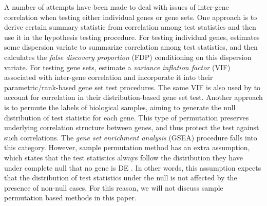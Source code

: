 	A number of attempts have been made to deal with issues of inter-gene correlation when testing 
	either individual genes or gene sets. One 
	approach is to derive certain summary statistic from correlation among test statistics and 
	then use it in the hypothesis testing procedure. For testing individual genes, 
	\citet{efron2007correlation} estimates some dispersion variate to summarize correlation among 
	test statistics, and then calculates the \textit{false discovery 
		proportion} (FDP) conditioning on this dispersion variate.  For 
	testing gene sets, \citet{wu2012camera} estimate a \textit{variance inflation factor} (VIF) 
	associated with inter-gene correlation and 
	incorporate it into their parametric/rank-based gene set test procedures. The same VIF is also 
	used by \citet{yaari2013quantitative} to account 
	for correlation in their distribution-based gene set test. Another approach is to permute the 
	labels of biological samples, aiming to generate the null distribution of test statistic for 
	each gene.
	This type of permutation preserves underlying correlation structure between genes, and thus 
	protect the test against such correlations. The 
	\textit{gene set enrichment analysis} (GSEA) procedure \citep{subramanian2005gene} falls into 
	this category.
	However, sample permutation method has an extra assumption, which states that the test 
	statistics always follow the distribution they have under complete null  that no gene is DE 
	\cite{efron2012large1}. In other words, this 
	assumption expects that the distribution of test statistics under the null is not affected by 
	the presence of non-null cases. For this reason, we will not discuss sample permutation based 
	methods in this paper.  
	
